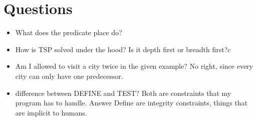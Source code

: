 \documentclass[runningheads]{llncs}
\begin{document}
\section{Questions}

\begin{itemize}
    \item What does the predicate place do?
    \item How is TSP solved under the hood? Is it depth first or breadth first?c
    \item Am I allowed to visit a city twice in the given example? No right, since every city can only have one predecessor.
    \item difference between DEFINE and TEST? Both are constraints that my program has to handle. Answer Define are integrity constraints, things that are implicit to humans.
\end{itemize}





\end{document}

